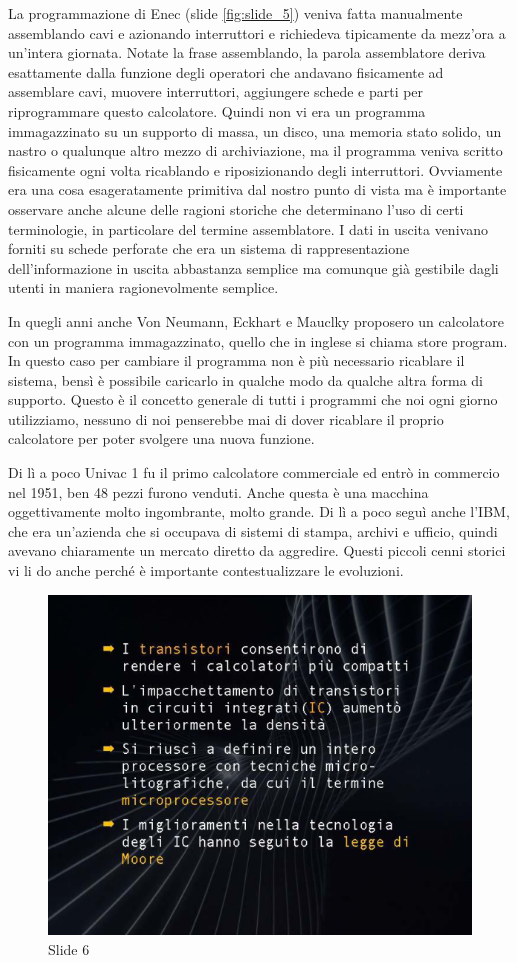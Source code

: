 La programmazione  di Enec (slide \ref{fig:slide_5}) veniva fatta manualmente assemblando cavi e azionando interruttori e richiedeva tipicamente da mezz'ora a un'intera giornata.
Notate la frase assemblando, la parola assemblatore deriva esattamente dalla funzione degli operatori che andavano fisicamente ad assemblare cavi, muovere interruttori, aggiungere schede e parti per riprogrammare questo calcolatore.
Quindi non vi era un programma immagazzinato su un supporto di massa, un disco, una memoria stato solido, un nastro o qualunque altro mezzo di archiviazione, ma il programma veniva scritto fisicamente ogni volta ricablando e riposizionando degli interruttori.
Ovviamente era una cosa esageratamente primitiva dal nostro punto di vista ma è importante osservare anche alcune delle ragioni storiche che determinano l'uso di certi terminologie, in particolare del termine assemblatore.
I dati in uscita venivano forniti su schede perforate che era un sistema di rappresentazione dell'informazione in uscita abbastanza semplice ma comunque già gestibile dagli utenti in maniera ragionevolmente semplice.

In quegli anni anche Von Neumann, Eckhart e Mauclky proposero un calcolatore con un programma immagazzinato, quello che in inglese si chiama store program.
In questo caso per cambiare il programma non è più necessario ricablare il sistema, bensì è possibile caricarlo in qualche modo da qualche altra forma di supporto.
Questo è il concetto generale di tutti i programmi che noi ogni giorno utilizziamo, nessuno di noi penserebbe mai di dover ricablare il proprio calcolatore per poter svolgere una nuova funzione.

Di lì a poco Univac 1 fu il primo calcolatore commerciale ed entrò in commercio nel 1951, ben 48 pezzi furono venduti.
Anche questa è una macchina oggettivamente molto ingombrante, molto grande.
Di lì a poco seguì anche l'IBM, che era un'azienda che si occupava di sistemi di stampa, archivi e ufficio, quindi avevano chiaramente un mercato diretto da aggredire.
Questi piccoli cenni storici vi li do anche perché è importante contestualizzare le evoluzioni.

\begin{figure}[ht]
    \centering
    \includegraphics[width=0.6\linewidth]{images/Lez01_p01_fig_06.png}
    \caption{Slide 6}
    \label{fig:slide_6}
\end{figure}

